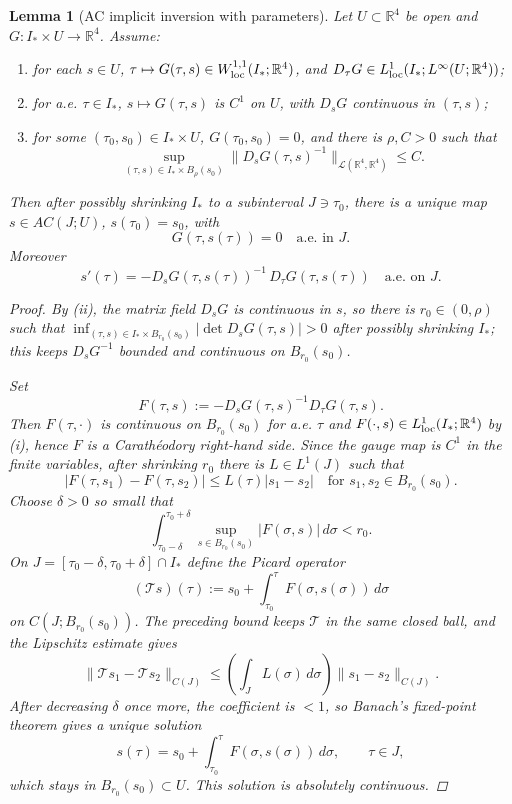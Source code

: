 \documentclass[11pt]{amsart}
\theoremstyle{plain}
\newtheorem{lemma}[theorem]{Lemma}
\theoremstyle{definition}
\theoremstyle{remark}
\newcommand{\RR}{\mathbb R}
\begin{document}
\begin{lemma}[AC implicit inversion with parameters]\label{lem:AC-IFT}
Let \(U\subset\RR^4\) be open and \(G:I_*\times U\to\RR^4\). Assume:
\begin{enumerate}
\item[(i)] for each \(s\in U\), \(\tau\mapsto G(\tau,s)\in W^{1,1}_{\rm loc}(I_*;\RR^4)\), and
  \(D_\tau G\in L^1_{\rm loc}(I_*;L^\infty(U;\RR^4))\);
\item[(ii)] for a.e. \(\tau\in I_*\), \(s\mapsto G(\tau,s)\) is \(C^1\) on \(U\), with \(D_sG\) continuous in \((\tau,s)\);
\item[(iii)] for some \((\tau_0,s_0)\in I_*\times U\), \(G(\tau_0,s_0)=0\), and there is \(\rho,C>0\) such that
\[
\sup_{(\tau,s)\in I_*\times B_\rho(s_0)}\|D_sG(\tau,s)^{-1}\|_{\mathcal L(\RR^4,\RR^4)}\le C.
\]
\end{enumerate}
Then after possibly shrinking \(I_*\) to a subinterval \(J\ni\tau_0\), there is a unique
map \(s\in AC(J;U)\), \(s(\tau_0)=s_0\), with
\[
G(\tau,s(\tau))=0\quad\text{a.e. in }J.
\]
Moreover
\[
s'(\tau)=-D_sG(\tau,s(\tau))^{-1}\,D_\tau G(\tau,s(\tau))\quad\text{a.e. on }J.
\]
\begin{proof}
By (ii), the matrix field \(D_sG\) is continuous in \(s\), so there is \(r_0\in(0,\rho)\) such that
\(\inf_{(\tau,s)\in I_*\times B_{r_0}(s_0)}|\det D_sG(\tau,s)|>0\) after possibly
shrinking \(I_*\); this keeps \(D_sG^{-1}\) bounded and continuous on \(B_{r_0}(s_0)\).

Set
\[
F(\tau,s):=-D_sG(\tau,s)^{-1}D_\tau G(\tau,s).
\]
Then \(F(\tau,\cdot)\) is continuous on \(B_{r_0}(s_0)\) for a.e. \(\tau\) and
\(F(\cdot,s)\in L^1_{\rm loc}(I_*;\mathbb R^4)\) by (i), hence \(F\) is a Carathéodory
right-hand side.  Since the gauge map is \(C^1\) in the finite variables, after
shrinking \(r_0\) there is \(L\in L^1(J)\) such that
\[
|F(\tau,s_1)-F(\tau,s_2)|\le L(\tau)|s_1-s_2|
\quad\text{for }s_1,s_2\in B_{r_0}(s_0).
\]
Choose \(\delta>0\) so small that
\[
\int_{\tau_0-\delta}^{\tau_0+\delta}\sup_{s\in B_{r_0}(s_0)}|F(\sigma,s)|\,d\sigma<r_0.
\]
On \(J=[\tau_0-\delta,\tau_0+\delta]\cap I_*\) define the Picard operator
\[
(\mathcal Ts)(\tau):=s_0+\int_{\tau_0}^{\tau}F(\sigma,s(\sigma))\,d\sigma
\]
on \(C(J;B_{r_0}(s_0))\).  The preceding bound keeps \(\mathcal T\) in the same
closed ball, and the Lipschitz estimate gives
\[
\|\mathcal T s_1-\mathcal T s_2\|_{C(J)}
\le \left(\int_J L(\sigma)\,d\sigma\right)\|s_1-s_2\|_{C(J)}.
\]
After decreasing \(\delta\) once more, the coefficient is \(<1\), so Banach's
fixed-point theorem gives a unique solution
\[
s(\tau)=s_0+\int_{\tau_0}^{\tau}F(\sigma,s(\sigma))\,d\sigma,\qquad
\tau\in J,
\]
which stays in \(B_{r_0}(s_0)\subset U\). This solution is absolutely continuous.


\end{proof}
\end{lemma}
\end{document}
